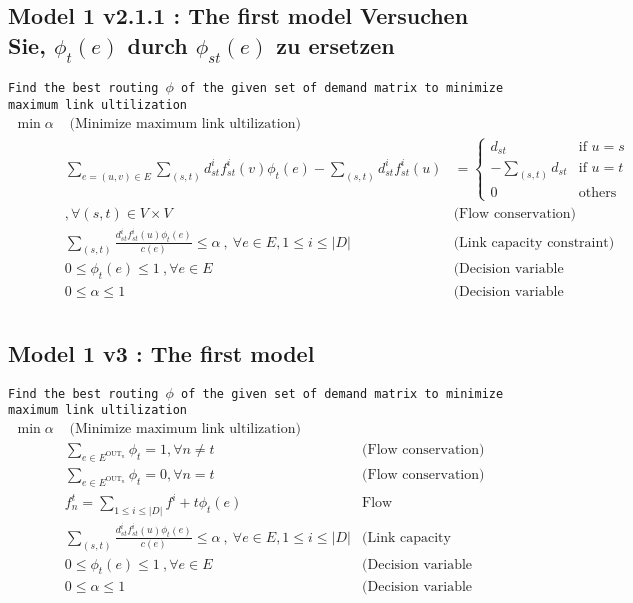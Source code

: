 \documentclass{ctexart}
\begin{document}
\subsection{Model 1 v2.1.1 : The first model Versuchen Sie, $\phi_t(e)$ durch $\phi_{st}(e)$ zu ersetzen}
\texttt{Find the best routing $\phi$ of the given set of demand matrix to minimize maximum link ultilization} 
\begin{equation}
	\begin{aligned}
		\min \alpha & \text{  (Minimize maximum link ultilization)}\\
		& \sum_{e=(u,v)\in E}\sum_{(s,t)}d_{st}^if_{st}^i(v)\phi_{t}(e)-\sum_{(s,t)}d_{st}^if_{st}^i(u) & =\begin{cases}
			d_{st} &\text{if } u=s \\
			-\sum_{(s,t)}d_{st} &\text{if } u=t \\
			0 &\text{others} 
		 \end{cases}\\
		&, \forall (s,t)\in V\times V & \text{(Flow conservation)}\\
		& \sum_{(s,t)}\frac{
			d_{st}^if_{st}^i(u)\phi_{t}(e)}{c(e)} \leq \alpha\ ,\ \forall e\in E,1\leq i\leq|\textit{D}| &  \text{(Link capacity constraint)} \\
		& 0\leq\phi_{t}(e)\leq1\ ,\forall e\in E\ & \text{(Decision variable constraint)}\\
		& 0\leq\alpha\leq1\ & \text{(Decision variable constraint)} \\
	\end{aligned}
\end{equation}

\subsection{Model 1 v3 : The first model }
\texttt{Find the best routing $\phi$ of the given set of demand matrix to minimize maximum link ultilization} 
\begin{equation}
	\begin{aligned}
		\min \alpha & \text{  (Minimize maximum link ultilization)}\\
		& \sum_{e\in E^{\text{OUT}_n}} \phi_t=1, \forall n\not=t & \text{(Flow conservation)}\\
		& \sum_{e\in E^{\text{OUT}_n}} \phi_t=0, \forall n = t & \text{(Flow conservation)}\\
		& f_n^t =\sum_{1\leq i\leq |\textit{D}|}f^i+t\phi_t(e) & \text{Flow}\\
		& \sum_{(s,t)}\frac{
			d_{st}^if_{st}^i(u)\phi_{t}(e)}{c(e)} \leq \alpha\ ,\ \forall e\in E,1\leq i\leq|\textit{D}| &  \text{(Link capacity constraint)} \\
		& 0\leq\phi_{t}(e)\leq1\ ,\forall e\in E\ & \text{(Decision variable constraint)}\\
		& 0\leq\alpha\leq1\ & \text{(Decision variable constraint)} \\
	\end{aligned}
\end{equation}
\end{document}
